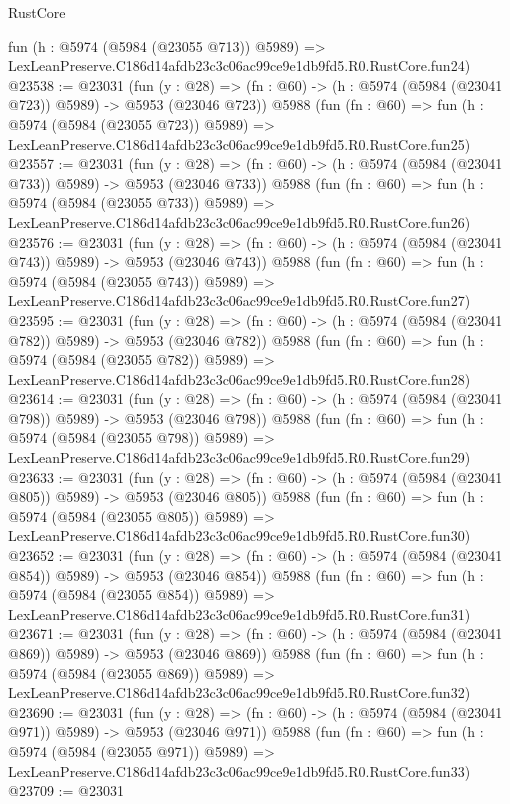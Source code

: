 \begin{lexlean}{RustCore}
\begin{coremodule}
    fun (h : @5974 (@5984 (@23055 @713)) @5989) =>
    LexLeanPreserve.C186d14afdb23c3c06ac99ce9e1db9fd5.R0.RustCore.fun24)
@23538 := @23031
    (fun (y : @28) => (fn : @60) -> (h : @5974 (@5984 (@23041 @723)) @5989) -> @5953 (@23046 @723))
    @5988
    (fun (fn : @60) =>
    fun (h : @5974 (@5984 (@23055 @723)) @5989) =>
    LexLeanPreserve.C186d14afdb23c3c06ac99ce9e1db9fd5.R0.RustCore.fun25)
@23557 := @23031
    (fun (y : @28) => (fn : @60) -> (h : @5974 (@5984 (@23041 @733)) @5989) -> @5953 (@23046 @733))
    @5988
    (fun (fn : @60) =>
    fun (h : @5974 (@5984 (@23055 @733)) @5989) =>
    LexLeanPreserve.C186d14afdb23c3c06ac99ce9e1db9fd5.R0.RustCore.fun26)
@23576 := @23031
    (fun (y : @28) => (fn : @60) -> (h : @5974 (@5984 (@23041 @743)) @5989) -> @5953 (@23046 @743))
    @5988
    (fun (fn : @60) =>
    fun (h : @5974 (@5984 (@23055 @743)) @5989) =>
    LexLeanPreserve.C186d14afdb23c3c06ac99ce9e1db9fd5.R0.RustCore.fun27)
@23595 := @23031
    (fun (y : @28) => (fn : @60) -> (h : @5974 (@5984 (@23041 @782)) @5989) -> @5953 (@23046 @782))
    @5988
    (fun (fn : @60) =>
    fun (h : @5974 (@5984 (@23055 @782)) @5989) =>
    LexLeanPreserve.C186d14afdb23c3c06ac99ce9e1db9fd5.R0.RustCore.fun28)
@23614 := @23031
    (fun (y : @28) => (fn : @60) -> (h : @5974 (@5984 (@23041 @798)) @5989) -> @5953 (@23046 @798))
    @5988
    (fun (fn : @60) =>
    fun (h : @5974 (@5984 (@23055 @798)) @5989) =>
    LexLeanPreserve.C186d14afdb23c3c06ac99ce9e1db9fd5.R0.RustCore.fun29)
@23633 := @23031
    (fun (y : @28) => (fn : @60) -> (h : @5974 (@5984 (@23041 @805)) @5989) -> @5953 (@23046 @805))
    @5988
    (fun (fn : @60) =>
    fun (h : @5974 (@5984 (@23055 @805)) @5989) =>
    LexLeanPreserve.C186d14afdb23c3c06ac99ce9e1db9fd5.R0.RustCore.fun30)
@23652 := @23031
    (fun (y : @28) => (fn : @60) -> (h : @5974 (@5984 (@23041 @854)) @5989) -> @5953 (@23046 @854))
    @5988
    (fun (fn : @60) =>
    fun (h : @5974 (@5984 (@23055 @854)) @5989) =>
    LexLeanPreserve.C186d14afdb23c3c06ac99ce9e1db9fd5.R0.RustCore.fun31)
@23671 := @23031
    (fun (y : @28) => (fn : @60) -> (h : @5974 (@5984 (@23041 @869)) @5989) -> @5953 (@23046 @869))
    @5988
    (fun (fn : @60) =>
    fun (h : @5974 (@5984 (@23055 @869)) @5989) =>
    LexLeanPreserve.C186d14afdb23c3c06ac99ce9e1db9fd5.R0.RustCore.fun32)
@23690 := @23031
    (fun (y : @28) => (fn : @60) -> (h : @5974 (@5984 (@23041 @971)) @5989) -> @5953 (@23046 @971))
    @5988
    (fun (fn : @60) =>
    fun (h : @5974 (@5984 (@23055 @971)) @5989) =>
    LexLeanPreserve.C186d14afdb23c3c06ac99ce9e1db9fd5.R0.RustCore.fun33)
@23709 := @23031

\end{coremodule}
\end{lexlean}
